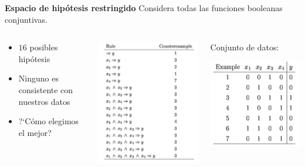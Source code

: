\documentclass[11pt]{beamer}
\begin{document}
\begin{frame}{\textbf{\textcolor{blue!55!yellow}{Espacio de hip\'otesis restringido}}}
Considera todas las funciones booleanas conjuntivas.
	
	\vspace{0.2cm}
	
	\begin{columns}
		\begin{column}{0.35\textwidth}
			\begin{itemize}
				\item $16$ posibles hip\'otesis
				\item Ninguno es consistente con nuestros datos
				\item ?`C\'omo elegimos el mejor?
			\end{itemize}
		\end{column}
		\begin{column}{0.4\textwidth}  
			\includegraphics[scale= 0.35]{ML8.png}
		\end{column}
		
		\begin{column}{0.3\textwidth}  
			Conjunto de datos:
			
			\includegraphics[scale= 0.2]{ML6.png}	
		\end{column}
	\end{columns}
\end{frame}
\end{document}
